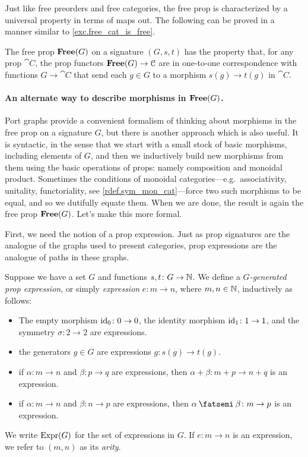 \documentclass[7Sketches]{subfiles}
\begin{document}
Just like free preorders and free categories, the free prop is characterized by
a universal property in terms of maps out. The following can be proved in a
manner similar to \cref{exc.free_cat_is_free}.

\begin{proposition}
The free prop $\mathbf{Free}(G)$ on a signature $(G,s,t)$ has the property that, for any
prop $\cat{C}$, the prop functors $\mathbf{Free}(G) \to \mathcal{C}$ are in one-to-one
correspondence with functions $G \to \cat{C}$ that send each $g \in G$ to a
morphism $s(g) \to t(g)$ in $\cat{C}$. 
\end{proposition}


\paragraph{An alternate way to describe morphisms in $\mathbf{Free}(G)$.}

Port graphs provide a convenient formalism of thinking about morphisms in the free prop on a signature $G$, but there is another approach which is also useful. It is syntactic, in the sense that we start with a small stock of basic morphisms, including elements of $G$, and then we inductively build new morphisms from them using the basic operations of props: namely composition and monoidal product. Sometimes the conditions of monoidal categories---e.g.\ associativity, unitality, functoriality, see \cref{rdef.sym_mon_cat}---force two such morphisms to be equal, and so we dutifully equate them. When we are done, the result is again the free prop $\mathbf{Free}(G)$. Let's make this more formal.

First, we need the notion of a prop expression. Just as prop signatures are the
analogue of the graphs used to present categories, prop expressions are the
analogue of paths in these graphs.

\begin{definition}%
\label{def.prop_expressions}%
  Suppose we have a set $G$ and functions $s,t\colon G \to \mathbb{N}$. We define a
  \emph{$G$-generated prop expression}, or simply \emph{expression} $e\colon m\to n$, where $m,n\in\mathbb{N}$, 
  inductively as follows:
\begin{itemize}
\item The empty morphism $\mathrm{id}_0 \colon 0 \to 0$, the identity morphism $\mathrm{id}_1\colon 1 \to
1$, and the symmetry $\sigma\colon 2 \to 2$ are expressions.%
\item the generators $g \in G$ are expressions $g\colon s(g) \to t(g)$.
\item if $\alpha\colon m \to n$ and $\beta\colon p \to q$ are expressions, then
$\alpha+\beta\colon m+p \to n+q$ is an expression.
\item if $\alpha\colon m \to n$ and $\beta\colon n \to p$ are expressions, then
$\alpha\cp\beta\colon m \to p$ is an expression.
\end{itemize}
We write $\mathrm{Expr}(G)$ for the set of expressions in $G$. If $e\colon m\to n$ is an expression, we refer to $(m,n)$ as its \emph{arity}.
\end{definition}%
\end{document}
